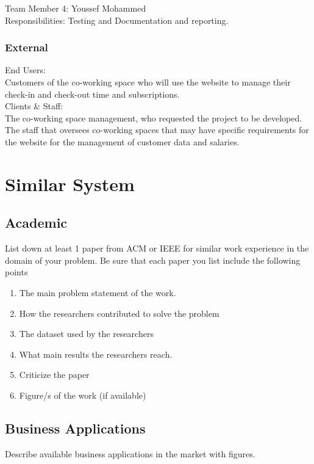 \documentclass[hidelinks,a4paper,12pt]{article}
\begin{document}
Team Member 4: Youssef Mohammed\\
Responsibilities: Testing and Documentation and reporting.\\ 

\subsubsection{External}
End Users:\\
Customers of the co-working space who will use the website to manage their check-in and check-out time and subscriptions.\\


Clients & Staff:\\
The co-working space management, who requested the project to be developed.\\
The staff that oversees co-working spaces that may have specific requirements for the website for the management of customer data and salaries. 

\section{Similar System}
\subsection{Academic}

List down at least 1 paper from ACM or IEEE for similar work experience in the domain of your problem. Be sure that each paper you list include the following points

\begin{enumerate}
\item The main problem statement of the work.
\item How the researchers contributed to solve the problem
\item The dataset used by the researchers
\item What main results the researchers reach.
\item Criticize the paper
\item Figure/s of the work (if available)
\end{enumerate}

\subsection{Business Applications}
Describe available business applications in the market with figures.
\end{document}
